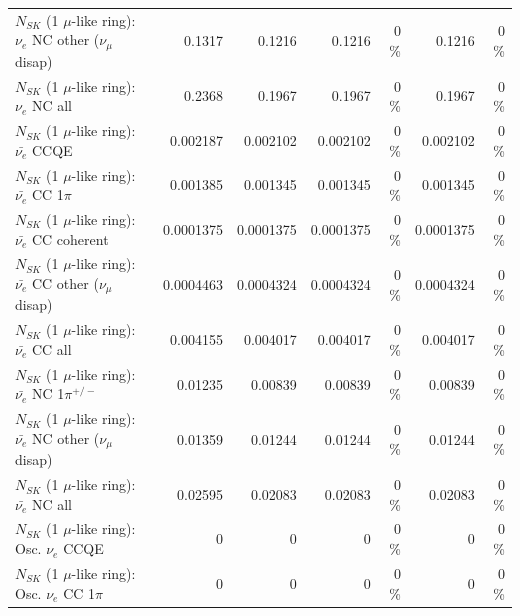 \begin{table}
\begin{tabular}{| l | r | r | r  r | r  r |}
                $N_{SK}$ (1 $\mu$-like ring): $\nu_e$ NC other ($\nu_\mu$ disap) &          0.1317 &          0.1216 &          0.1216 &        0 \%  &          0.1216 &        0 \%  \\ 
                                  $N_{SK}$ (1 $\mu$-like ring): $\nu_{e}$ NC all &          0.2368 &          0.1967 &          0.1967 &        0 \%  &          0.1967 &        0 \%  \\ 
\hline
\hline
\hline
                                $N_{SK}$ (1 $\mu$-like ring): $\bar{\nu_e}$ CCQE &        0.002187 &        0.002102 &        0.002102 &        0 \%  &        0.002102 &        0 \%  \\ 
                           $N_{SK}$ (1 $\mu$-like ring): $\bar{\nu_e}$ CC 1$\pi$ &        0.001385 &        0.001345 &        0.001345 &        0 \%  &        0.001345 &        0 \%  \\ 
                         $N_{SK}$ (1 $\mu$-like ring): $\bar{\nu_e}$ CC coherent &       0.0001375 &       0.0001375 &       0.0001375 &        0 \%  &       0.0001375 &        0 \%  \\ 
          $N_{SK}$ (1 $\mu$-like ring): $\bar{\nu_e}$ CC other ($\nu_\mu$ disap) &       0.0004463 &       0.0004324 &       0.0004324 &        0 \%  &       0.0004324 &        0 \%  \\ 
                            $N_{SK}$ (1 $\mu$-like ring): $\bar{\nu_{e}}$ CC all &        0.004155 &        0.004017 &        0.004017 &        0 \%  &        0.004017 &        0 \%  \\ 
\hline
                     $N_{SK}$ (1 $\mu$-like ring): $\bar{\nu_e}$ NC 1$\pi^{+/-}$ &         0.01235 &         0.00839 &         0.00839 &        0 \%  &         0.00839 &        0 \%  \\ 
          $N_{SK}$ (1 $\mu$-like ring): $\bar{\nu_e}$ NC other ($\nu_\mu$ disap) &         0.01359 &         0.01244 &         0.01244 &        0 \%  &         0.01244 &        0 \%  \\ 
                            $N_{SK}$ (1 $\mu$-like ring): $\bar{\nu_{e}}$ NC all &         0.02595 &         0.02083 &         0.02083 &        0 \%  &         0.02083 &        0 \%  \\ 
\hline
\hline
\hline
                                 $N_{SK}$ (1 $\mu$-like ring): Osc. $\nu_e$ CCQE &               0 &               0 &               0 &        0 \%  &               0 &        0 \%  \\ 
                            $N_{SK}$ (1 $\mu$-like ring): Osc. $\nu_e$ CC 1$\pi$ &               0 &               0 &               0 &        0 \%  &               0 &        0 \%  \\ 

\end{tabular}
\end{table}
